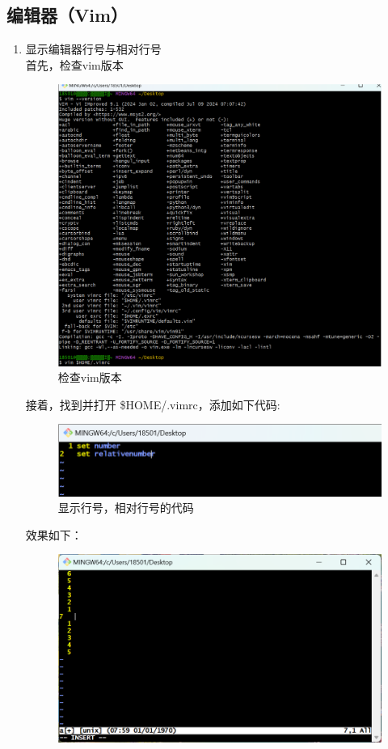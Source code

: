 \documentclass{ctexart}
\begin{document}
\subsection{编辑器（Vim）}
\begin{enumerate}
    \item 显示编辑器行号与相对行号\\
    首先，检查vim版本\\
    \begin{figure}[H]
       \centering
       \includegraphics[width=14cm]{7ab83e3cf740c5a883a0b180edad18bf.png}
       \caption{检查vim版本}
       \label{fig:2}
   \end{figure}
   接着，找到并打开 \$HOME/.vimrc，添加如下代码:\\
   \begin{figure}[H]
    \centering
    \includegraphics[width=14cm]{aab8e4332690e46b2e4f42720441a268.png}
    \caption{显示行号，相对行号的代码}
    \label{fig:2}
    \end{figure}
    效果如下：
    \begin{figure}[H]
        \centering
        \includegraphics[width=14cm]{ac42008faf4a3fbf2da932e7ddb25f4d.png}

\end{figure}
\end{enumerate}
\end{document}
